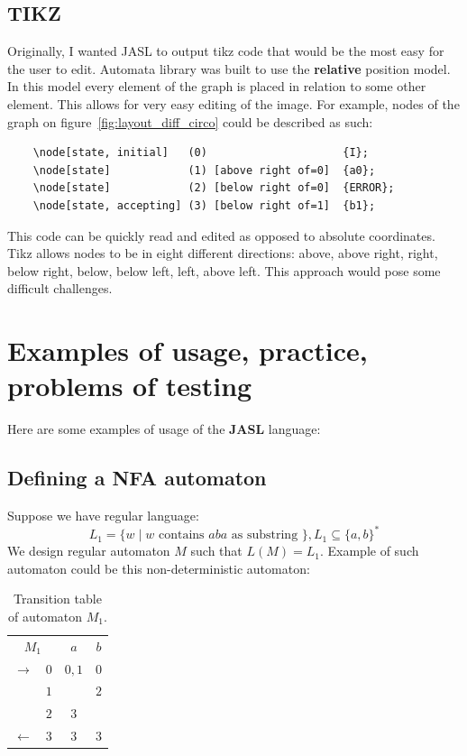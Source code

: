 \documentclass{ctuthesis}
\begin{document}
\section{TIKZ}
Originally, I wanted JASL to output tikz code that would be the most easy for the user to edit. Automata library was built to use the \textbf{relative} position model. In this model every element of the graph is placed in relation to some other element. This allows for very easy editing of the image. For example, nodes of the graph on figure~\ref{fig:layout_diff_circo} could be described as such:

\begin{verbatim}
	\node[state, initial] 	(0) 					{I};
	\node[state] 			(1) [above right of=0] 	{a0};
	\node[state] 			(2) [below right of=0] 	{ERROR};
	\node[state, accepting] (3) [below right of=1] 	{b1};
\end{verbatim}

This code can be quickly read and edited as opposed to absolute coordinates. Tikz allows nodes to be in eight different directions: above, above right, right, below right, below, below left, left, above left. This approach would pose some difficult challenges.

\chapter{Examples of usage, practice, problems of testing}
Here are some examples of usage of the \textbf{JASL} language: 

\section{Defining a NFA automaton}
\label{sec:example_NFA}
Suppose we have regular language: 
\begin{equation*}
L_1 = \{w \mid w \text{ contains } aba \text{ as substring }\}, L_1 \subseteq \{a, b\}^*
\end{equation*} 
We design regular automaton $M$ such that $L(M) = L_1$. Example of such automaton could be this non-deterministic automaton:
\begin{table}[H]
\begin{ctucolortab}
\begin{tabular}{cc|cc}
\multicolumn{2}{c}{\bfseries $M_1$} & \bfseries $a$ & \bfseries $b$ \\\Midrule
$\rightarrow$ 	& $0$ & $0,1$ 	& $0$  \\
				& $1$ &  	& $2$  \\
				& $2$ & $3$		&  \\
$\leftarrow$	& $3$ & $3$		& $3$ 
\end{tabular}
\end{ctucolortab}
\caption{Transition table of automaton $M_1$.}
\label{fig:examples_NFA_table}
\end{table} 
\end{document}
